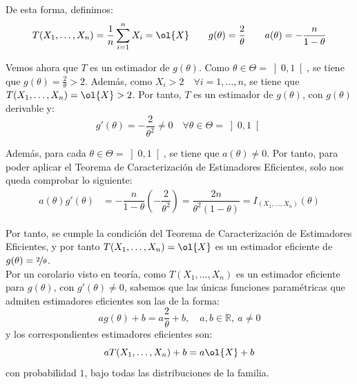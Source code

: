 \documentclass[12pt]{article}
\newcommand{\R}{\mathbb{R}}
\begin{document}
\begin{ejercicio}[2.25 puntos]
\begin{enumerate}[label=\alph*)]
\begin{enumerate}[label=\alph*)]
                    De esta forma, definimos:
                    \begin{equation*}
                        T(X_1, \ldots, X_n) = \dfrac{1}{n} \sum_{i=1}^{n} X_i = \ol{X}\qquad g(\theta) = \dfrac{2}{\theta}\qquad a(\theta) = -\dfrac{n}{1-\theta}
                    \end{equation*}

                    Vemos ahora que $T$ es un estimador de $g(\theta)$. Como $\theta \in \Theta = \left]0, 1 \right[$, se tiene que $g(\theta) = \frac{2}{\theta} > 2$. Además, como $X_i>2 \quad \forall i = 1, \ldots, n$, se tiene que $T(X_1, \ldots, X_n) = \ol{X} > 2$. Por tanto, $T$ es un estimador de $g(\theta)$, con $g(\theta)$ derivable y:
                    \begin{equation*}
                        g'(\theta) = -\dfrac{2}{\theta^2} \neq 0 \quad \forall \theta \in \Theta = \left]0, 1 \right[
                    \end{equation*}

                    Además, para cada $\theta \in \Theta = \left]0, 1 \right[$, se tiene que $a(\theta)\neq 0$. Por tanto, para poder aplicar el Teorema de Caracterización de Estimadores Eficientes, solo nos queda comprobar lo siguiente:
                    \begin{align*}
                        a(\theta) g'(\theta) &= -\dfrac{n}{1-\theta} \left( -\dfrac{2}{\theta^2} \right) = \dfrac{2n}{\theta^2(1-\theta)} = I_{(X_1, \ldots, X_n)}(\theta)
                    \end{align*}

                    Por tanto, se cumple la condición del Teorema de Caracterización de Estimadores Eficientes, y por tanto $T(X_1, \ldots, X_n) = \ol{X}$ es un estimador eficiente de $g(\theta) = \nicefrac{2}{\theta}$.\\
                    
                    Por un corolario visto en teoría, como $T(X_1, \ldots, X_n)$ es un estimador eficiente para $g(\theta)$, con $g'(\theta) \neq 0$,
                    sabemos que las únicas funciones paramétricas que admiten estimadores eficientes son las de la forma:
                    \begin{equation*}
                        a g(\theta) + b = a \dfrac{2}{\theta} + b, \quad a, b \in \R,\ a \neq 0
                    \end{equation*}
                    y los correspondientes estimadores eficientes son:
                    \begin{equation*}
                        a T(X_1, \ldots, X_n) + b = a \ol{X} + b
                    \end{equation*}
                    con probabilidad $1$, bajo todas las distribuciones de la familia.


\end{enumerate}
\end{enumerate}
\end{ejercicio}
\end{document}
